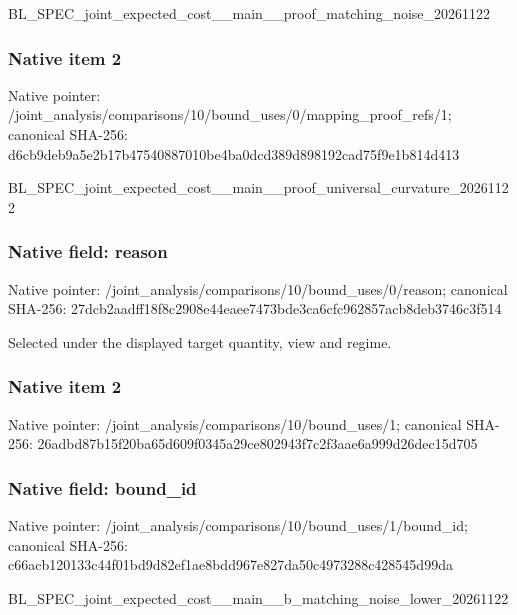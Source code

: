 \documentclass[10pt,a4paper]{article}
\begin{document}
BL\_SPEC\_joint\_expected\_c\allowbreak{}ost\_\_main\_\_proof\_matchin\allowbreak{}g\_noise\_20261122


\subsubsection{Native item 2}


Native pointer: /joint\_analysis/comparis\allowbreak{}ons/10/bound\_uses/0/mapp\allowbreak{}ing\_proof\_refs/1; canonical SHA-256: d6cb9deb9a5e2b17b4754088\allowbreak{}7010be4ba0dcd389d898192c\allowbreak{}ad75f9e1b814d413


BL\_SPEC\_joint\_expected\_c\allowbreak{}ost\_\_main\_\_proof\_univers\allowbreak{}al\_curvature\_20261122


\subsubsection{Native field: reason}


Native pointer: /joint\_analysis/comparis\allowbreak{}ons/10/bound\_uses/0/reas\allowbreak{}on; canonical SHA-256: 27dcb2aadff18f8c2908e44e\allowbreak{}aee7473bde3ca6cfc962857a\allowbreak{}cb8deb3746c3f514


Selected under the displayed target quantity, view and regime.


\subsubsection{Native item 2}


Native pointer: /joint\_analysis/comparis\allowbreak{}ons/10/bound\_uses/1; canonical SHA-256: 26adbd87b15f20ba65d609f0\allowbreak{}345a29ce802943f7c2f3aae6\allowbreak{}a999d26dec15d705



\subsubsection{Native field: bound\_id}


Native pointer: /joint\_analysis/comparis\allowbreak{}ons/10/bound\_uses/1/boun\allowbreak{}d\_id; canonical SHA-256: c66acb120133c44f01bd9d82\allowbreak{}ef1ae8bdd967e827da50c497\allowbreak{}3288c428545d99da


BL\_SPEC\_joint\_expected\_c\allowbreak{}ost\_\_main\_\_b\_matching\_no\allowbreak{}ise\_lower\_20261122
\end{document}
